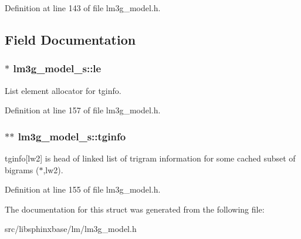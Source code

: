 Definition at line 143 of file lm3g\_\-model.h.

\subsection{Field Documentation}
\subsubsection[{le}]{$\ast$ {\bf lm3g\_\-model\_\-s::le}}\label{structlm3g__model__s_2c96ba8aa34632e4d42908f9384d1b01}


List element allocator for tginfo. 



Definition at line 157 of file lm3g\_\-model.h.
\subsubsection[{tginfo}]{$\ast$$\ast$ {\bf lm3g\_\-model\_\-s::tginfo}}\label{structlm3g__model__s_9be0c8197334e3ef632e9e3abdad6a4f}


tginfo[lw2] is head of linked list of trigram information for some cached subset of bigrams ($\ast$,lw2). 



Definition at line 155 of file lm3g\_\-model.h.

The documentation for this struct was generated from the following file:\begin{CompactItemize}
\item 
src/libsphinxbase/lm/lm3g\_\-model.h\end{CompactItemize}
